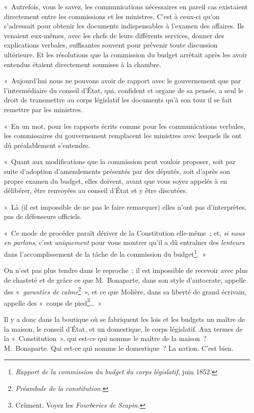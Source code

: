 \documentclass[french,twoside]{book} %
\newenvironment{quoteblock}%
  {\begin{quoting}}
  {\end{quoting}}
\newenvironment{quotebar}{%
    \def\FrameCommand{{\color{rubric!10!}\vrule width 0.5em} \hspace{0.9em}}%
    \def\OuterFrameSep{0pt} %
    \MakeFramed {\advance\hsize-\width \FrameRestore}
  }%
  {%
    \endMakeFramed
  }
\renewenvironment{quoteblock}%
  {%
    \savenotes
    \setstretch{0.9}
    \begin{quotebar}
    \smallskip
  }
  {%
    \smallskip
    \end{quotebar}
    \spewnotes
  }
\begin{document}
\begin{quoteblock}
 \noindent « Autrefois, vous le savez, les communications nécessaires en pareil cas existaient directement entre les commissions et les ministres. C’est à ceux-ci qu’on s’adressait pour obtenir les documents indispensables à l’examen des affaires. Ils venaient eux-mêmes, avec les chefs de leurs différents services, donner des explications verbales, suffisantes souvent pour prévenir toute discussion ultérieure. Et les résolutions que la commission du budget arrêtait après les avoir entendus étaient directement soumises à la chambre.\par
 « Aujourd’hui nous ne pouvons avoir de rapport avec le gouvernement que par l’intermédiaire du conseil d’État, qui, confident et organe de sa pensée, a seul le droit de transmettre au corps législatif les documents qu’à son tour il se fait remettre par les ministres.\par
 « En un mot, pour les rapports écrits comme pour les communications verbales, les commissaires du gouvernement remplacent les ministres avec lesquels ils ont dû préalablement s’entendre.\par
 « Quant aux modifications que la commission peut vouloir proposer, soit par suite d’adoption d’amendements présentés par des députés, soit d’après son propre examen du budget, elles doivent, avant que vous soyez appelés à en délibérer, être renvoyées au conseil d’État et y être discutées.\par
 « Là (il est impossible de ne pas le faire remarquer) elles n’ont pas d’interprètes, pas de défenseurs officiels.\par
 « Ce mode de procéder paraît dériver de la Constitution elle-même ; et, \emph{si nous en parlons}, c’est \emph{uniquement} pour vous montrer qu’il a dû entraîner des \emph{lenteurs} dans l’accomplissement de la tâche de la commission du budget\footnote{\emph{Rapport de la commission du budget du corps législatif}, juin 1852.}. »
 \end{quoteblock}

\noindent On n’est pas plus tendre dans le reproche ; il est impossible de recevoir avec plus de chasteté et de grâce ce que M. Bonaparte, dans son style d’autocrate, appelle des « \emph{garanties de calme}\footnote{\emph{Préambule de la constitution.}} », et ce que Molière, dans sa liberté de grand écrivain, appelle des « coups de pied\footnote{Crûment. Voyez les \emph{Fourberies de Scapin.}}… »\par
Il y a donc dans la boutique où se fabriquent les lois et les budgets un maître de la maison, le conseil d’État, et un domestique, le corps législatif. Aux termes de la « Constitution », qui est-ce qui nomme le maître de la maison ? M. Bonaparte. Qui est-ce qui nomme le domestique ? La nation. C’est bien.
\end{document}

